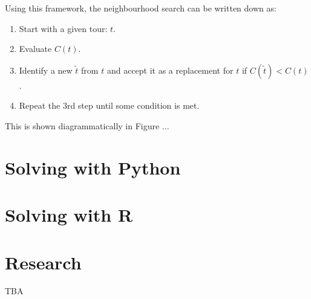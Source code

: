 Using this framework, the neighbourhood search can be written down as:

\begin{enumerate}
    \item Start with a given tour: \(t\).
    \item Evaluate \(C(t)\).
    \item Identify a new \(\tilde t\) from \(t\) and accept it as a replacement
        for \(t\) if \(C(\tilde t)<
        C(t)\).
    \item Repeat the 3rd step until some condition is met.
\end{enumerate}

This is shown diagrammatically in Figure ... %
\section{Solving with Python}\label{sec:solving-with-python}

\section{Solving with R}\label{sec:solving-with-R}

\section{Research}\label{sec:research}

TBA
